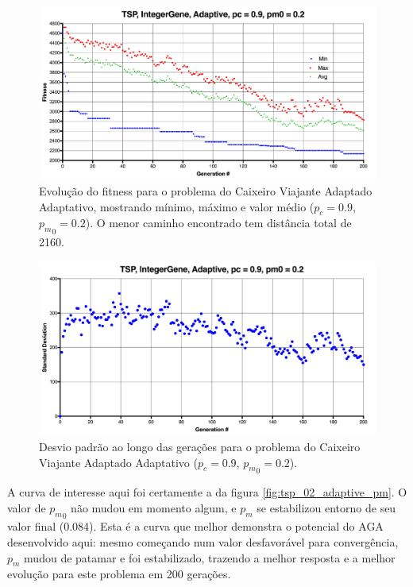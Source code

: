 \begin{figure}[ht!]
    \centering \includegraphics[width=1.0\textwidth]{tsp_02_adaptive.jpg}
    \caption{Evolução do fitness para o problema do Caixeiro Viajante Adaptado Adaptativo, mostrando mínimo, máximo e valor médio ($p_c=0.9$, ${p_m}_0=0.2$). O menor caminho encontrado tem distância total de 2160.}
    \label{fig:tsp_02_adaptative}
\end{figure}

\begin{figure}[ht!]
    \centering \includegraphics[width=1.0\textwidth]{tsp_02_adaptive_std.jpg}
    \caption{Desvio padrão ao longo das gerações para o problema do Caixeiro Viajante Adaptado Adaptativo ($p_c=0.9$, ${p_m}_0=0.2$).}
    \label{fig:tsp_02_adaptive_std}
\end{figure}

A curva de interesse aqui foi certamente a da figura \ref{fig:tsp_02_adaptive_pm}. O valor de ${p_m}_0$ não mudou em momento algum, e $p_m$ se estabilizou entorno de seu valor final (0.084). Esta é a curva que melhor demonstra o potencial do AGA desenvolvido aqui: mesmo começando num valor desfavorável para convergência, $p_m$ mudou de patamar e foi estabilizado, trazendo a melhor resposta e a melhor evolução para este problema em 200 gerações.

